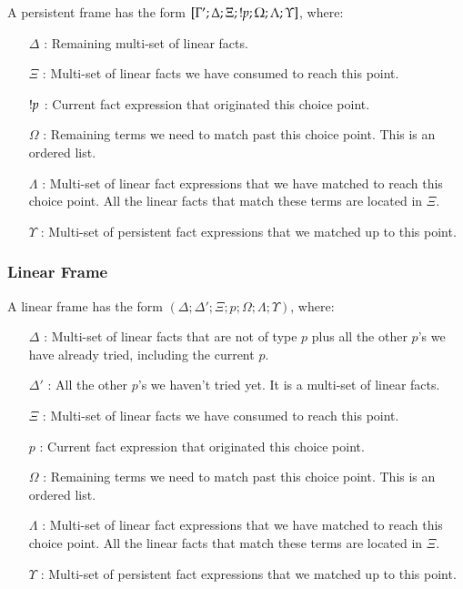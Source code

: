 A persistent frame has the form $[\Gamma'; \Delta; \Xi; {!} p; \Omega; \Lambda; \Upsilon]$, where:

\begin{enumerate}
   \item[$\Delta$]: Remaining multi-set of linear facts.
   \item[$\Xi$]: Multi-set of linear facts we have consumed to reach this point.
   \item[${!} p$]: Current fact expression that originated this choice point.
   \item[$\Omega$]: Remaining terms we need to match past this choice point. This is an ordered list.
   \item[$\Lambda$]: Multi-set of linear fact expressions that we have matched to reach this choice point. All the linear facts that match these terms are located in $\Xi$.
   \item[$\Upsilon$]: Multi-set of persistent fact expressions that we matched up to this point.
\end{enumerate}

\subsubsection{Linear Frame}

A linear frame has the form $(\Delta; \Delta'; \Xi; p; \Omega; \Lambda; \Upsilon)$, where:

\begin{enumerate}
   \item[$\Delta$]: Multi-set of linear facts that are not of type $p$ plus all the other $p$'s we have already tried, including the current $p$.
   \item[$\Delta'$]: All the other $p$'s we haven't tried yet. It is a multi-set of linear facts.
   \item[$\Xi$]: Multi-set of linear facts we have consumed to reach this point.
   \item[$p$]: Current fact expression that originated this choice point.
   \item[$\Omega$]: Remaining terms we need to match past this choice point. This is an ordered list.
   \item[$\Lambda$]: Multi-set of linear fact expressions that we have matched to reach this choice point. All the linear facts that match these terms are located in $\Xi$.
   \item[$\Upsilon$]: Multi-set of persistent fact expressions that we matched up to this point.
\end{enumerate}

